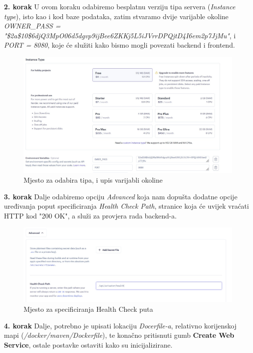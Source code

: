 			\textbf{2. korak} \newline U ovom koraku odabiremo besplatnu verziju tipa servera (\textit{Instance type}), isto kao i kod baze podataka, zatim stvaramo dvije varijable okoline \textit{OWNER\_PASS = "\$2a\$10\$6djQ3MpO06d5dgvp9ijBee6ZKKj5L5iJVrrDPQjtD4I6em2p7JjMu"}, i \textit{PORT = 8080},
			koje će služiti kako bismo mogli povezati backend i frontend.
			\begin{figure}[H]
				\includegraphics[width=\linewidth]{slike/BackendPtToo.JPG}
				\centering
				\caption{Mjesto za odabira tipa, i upis varijabli okoline}
				\label{fig:Backend drugi}
			\end{figure}
			\textbf{3. korak} \newline Dalje odabiremo opciju \textit{Advanced} koja nam dopušta dodatne opcije uređivanja poput specificiranja \textit{Health Check Path}, stranice koja će uvijek vraćati HTTP kod "200 OK", a služi za provjera rada backend-a.
			\begin{figure}[H]
				\includegraphics[width=\linewidth]{slike/BackendPtTree.JPG}
				\centering
				\caption{Mjesto za specificiranja Health Check puta}
				\label{fig:Backend treći}
			\end{figure}
			\textbf{4. korak} \newline Dalje, potrebno je upisati lokaciju \textit{Docerfile-a}, relativno korijenskoj mapi (\textit{/docker/maven/Dockerfile}), te konačno pritisnuti gumb \textbf{Create Web Service}, ostale postavke ostaviti kako su inicijalizirane.
